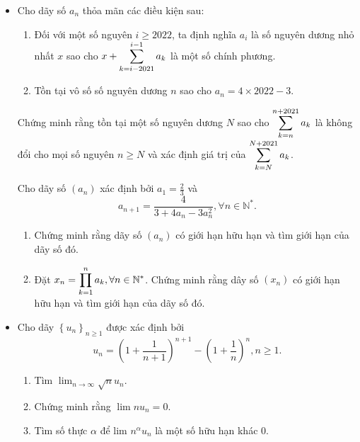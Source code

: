 \documentclass[11pt]{scrartcl}
\begin{document}
\begin{itemize}[label=, leftmargin=0em, itemsep=0.5em]
\begin{btvn}
    \end{btvn}
    \item \begin{btvn}
        Cho dãy số ${a_n}$ thỏa mãn các điều kiện sau:
        \begin{enumerate}[label=(\alph*)]
            \item Đối với một số nguyên $i \geq 2022$, ta định nghĩa $a_i$ là số nguyên dương nhỏ nhất $x$ sao cho $x+\displaystyle\sum_{k=i-2021}^{i-1}a_k$ là một số chính phương.
            \item Tồn tại vô số số nguyên dương $n$ sao cho $a_n=4\times 2022-3$.
        \end{enumerate}
        Chứng minh rằng tồn tại một số nguyên dương $N$ sao cho $\displaystyle\sum_{k=n}^{n+2021}a_k$ là không đổi cho mọi số nguyên $n \geq N$ và xác định giá trị của $\displaystyle\sum_{k=N}^{N+2021}a_k$.
    \end{btvn}
    \begin{btvn}
        Cho dãy số $\left(a_n\right)$ xác định bởi $a_1=\frac{2}{3}$ và
        $$
        a_{n+1}=\frac{4}{3+4 a_n-3 a_n^2}, \forall n \in \mathbb{N}^* .
        $$
        \begin{enumerate}
            \item Chứng minh rằng dãy số $\left(a_n\right)$ có giới hạn hữu hạn và tìm giới hạn của dãy số đó.
            \item Đặt $x_n=\displaystyle\prod_{k=1}^n a_k, \forall n \in \mathbb{N}^*$. Chứng minh rằng dây số $\left(x_n\right)$ có giới hạn hữu hạn và tìm giới hạn của dãy số đó.
        \end{enumerate}
    \end{btvn}
    \item\begin{btvn}
        Cho dãy $\left\{u_n\right\}_{n \geq 1}$ được xác định bởi
        $$
        u_n=\left(1+\frac{1}{n+1}\right)^{n+1}-\left(1+\frac{1}{n}\right)^n, n \geq 1 .
        $$
        \begin{enumerate}[label=(\alph*)]
            \item Tìm $\displaystyle \lim _{n \rightarrow \infty} \sqrt{n} u_n$.
            \item Chứng minh rằng $\lim n u_n=0$.
            \item Tìm số thực $\alpha$ để lim $n^\alpha u_n$ là một số hữu hạn khác 0.
        \end{enumerate}

\end{btvn}
\end{itemize}
\end{document}
